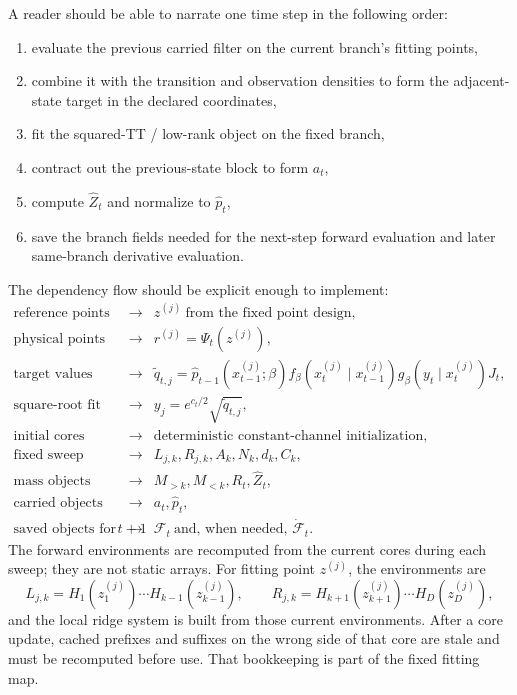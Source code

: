 A reader should be able to narrate one time step in the following order:
\begin{enumerate}[leftmargin=0.28in]
  \item evaluate the previous carried filter on the current branch’s fitting
  points,
  \item combine it with the transition and observation densities to form the
  adjacent-state target in the declared coordinates,
  \item fit the squared-TT / low-rank object on the fixed branch,
  \item contract out the previous-state block to form \(a_t\),
  \item compute \(\widehat Z_t\) and normalize to \(\widehat p_t\),
  \item save the branch fields needed for the next-step forward evaluation and
  later same-branch derivative evaluation.
\end{enumerate}

The dependency flow should be explicit enough to implement:
\begin{equation}
\begin{array}{rcl}
\text{reference points} &\longrightarrow& z^{(j)}\ \text{from the fixed point design},\\
\text{physical points} &\longrightarrow& r^{(j)}=\Psi_t(z^{(j)}),\\
\text{target values} &\longrightarrow&
\widetilde q_{t,j}=
\widehat p_{t-1}(x_{t-1}^{(j)};\beta)
 f_\beta(x_t^{(j)}\mid x_{t-1}^{(j)})
 g_\beta(y_t\mid x_t^{(j)})J_t,\\
\text{square-root fit values} &\longrightarrow&
 y_j=e^{c_t/2}\sqrt{\widetilde q_{t,j}},\\
\text{initial cores} &\longrightarrow&
 \text{deterministic constant-channel initialization},\\
\text{fixed sweep objects} &\longrightarrow&
 L_{j,k},R_{j,k},A_k,N_k,d_k,C_k,\\
\text{mass objects} &\longrightarrow&
 M_{>k},M_{<k},R_t,\widehat Z_t,\\
\text{carried objects} &\longrightarrow&
 a_t,\widehat p_t,\\
\text{saved objects for }t+1 &\longrightarrow&
 \mathcal F_t\ \text{and, when needed, }\dot{\mathcal F}_t.
\end{array}
  \label{eq:bf-hd-squared-tt-forward-flow}
\end{equation}
The forward environments are recomputed from the current cores during each sweep;
they are not static arrays.  For fitting point \(z^{(j)}\), the environments are
\begin{equation}
  L_{j,k}=H_1(z_1^{(j)})\cdots H_{k-1}(z_{k-1}^{(j)}),
  \qquad
  R_{j,k}=H_{k+1}(z_{k+1}^{(j)})\cdots H_D(z_D^{(j)}),
  \label{eq:bf-hd-squared-tt-environments}
\end{equation}
and the local ridge system is built from those current environments.  After a
core update, cached prefixes and suffixes on the wrong side of that core are
stale and must be recomputed before use.  That bookkeeping is part of the fixed
fitting map.

